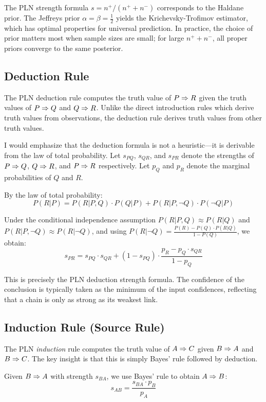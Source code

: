 \documentclass[]{article}
\begin{document}
The PLN strength formula $s = n^+ / (n^+ + n^-)$ corresponds to the
Haldane prior.  The Jeffreys prior $\alpha = \beta = \frac{1}{2}$
yields the Krichevsky-Trofimov estimator, which has optimal properties
for universal prediction.  In practice, the choice of prior matters
most when sample sizes are small; for large $n^+ + n^-$, all proper
priors converge to the same posterior.

\subsection{Deduction Rule}
\label{sec:deduction}
The PLN deduction rule computes the truth value of $P \Rightarrow R$ given
the truth values of $P \Rightarrow Q$ and $Q \Rightarrow R$.  Unlike the direct
introduction rules which derive truth values from observations, the
deduction rule derives truth values from other truth values.

I would emphasize that the deduction formula is not a heuristic---it
is derivable from the law of total probability.  Let $s_{PQ}$,
$s_{QR}$, and $s_{PR}$ denote the strengths of $P \Rightarrow Q$, $Q \Rightarrow
R$, and $P \Rightarrow R$ respectively.  Let $p_Q$ and $p_R$ denote the
marginal probabilities of $Q$ and $R$.

By the law of total probability:
$$P(R|P) = P(R|P,Q) \cdot P(Q|P) + P(R|P,\neg Q) \cdot P(\neg Q|P)$$

Under the conditional independence assumption $P(R|P,Q) \approx
P(R|Q)$ and $P(R|P,\neg Q) \approx P(R|\neg Q)$, and using $P(R|\neg
Q) = \frac{P(R) - P(Q) \cdot P(R|Q)}{1 - P(Q)}$, we obtain:
$$s_{PR} = s_{PQ} \cdot s_{QR} + (1 - s_{PQ}) \cdot \frac{p_R - p_Q \cdot s_{QR}}{1 - p_Q}$$

This is precisely the PLN deduction strength formula.  The confidence
of the conclusion is typically taken as the minimum of the input
confidences, reflecting that a chain is only as strong as its weakest
link.

\subsection{Induction Rule (Source Rule)}
\label{sec:induction}
The PLN \emph{induction} rule computes the truth value of $A \Rightarrow C$
given $B \Rightarrow A$ and $B \Rightarrow C$.  The key insight is that this is
simply Bayes' rule followed by deduction.

Given $B \Rightarrow A$ with strength $s_{BA}$, we use Bayes' rule to obtain
$A \Rightarrow B$:
$$s_{AB} = \frac{s_{BA} \cdot p_B}{p_A}$$
\end{document}
